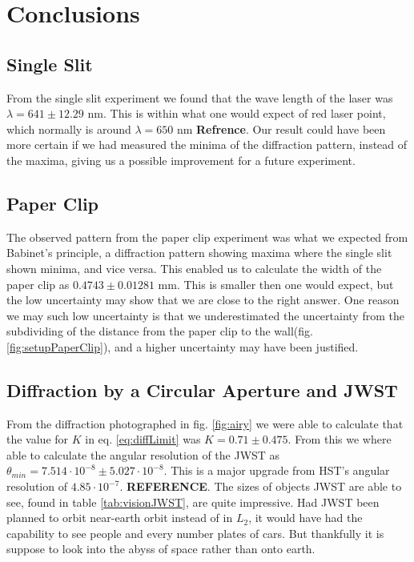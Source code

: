 \documentclass{emulateapj}
\begin{document}
\section{Conclusions}
\label{sec:conclusions}

\subsection{Single Slit}
From the single slit experiment we found that the wave length of the laser was $\lambda = 641 \pm 12.29 \text{ nm}$. This is within what one would expect of red laser point, which normally is around $\lambda = 650$ nm \textbf{Refrence}. Our result could have been more certain if we had measured the minima of the diffraction pattern, instead of the maxima, giving us a possible improvement for a future experiment.

\subsection{Paper Clip}
The observed pattern from the paper clip experiment was what we expected from Babinet's principle, a diffraction pattern showing maxima where the single slit shown minima, and vice versa. This enabled us to calculate the width of the paper clip as $0.4743 \pm 0.01281 \text{ mm}$. This is smaller then one would expect, but the low uncertainty may show that we are close to the right answer. One reason we may such low uncertainty is that we underestimated the uncertainty from the subdividing of the distance from the paper clip to the wall(fig. \ref{fig:setupPaperClip}), and a higher uncertainty may have been justified.

\subsection{Diffraction by a Circular Aperture and JWST}
From the diffraction photographed in fig. \ref{fig:airy} we were able to calculate that the value for $K$ in eq. \ref{eq:diffLimit} was $K = 0.71 \pm 0.475$. From this we where able to calculate the angular resolution of the JWST as  $\theta_{min} = 7.514\cdot 10^{-8} \pm 5.027\cdot 10^{-8}$. This is a major upgrade from HST's angular resolution of $4.85\cdot10^{-7}$. \textbf{REFERENCE}. The sizes of objects JWST are able to see, found in table \ref{tab:visionJWST}, are quite impressive. Had JWST been planned to orbit near-earth orbit instead of in $L_2$, it would have had the capability to see people and every number plates of cars. But thankfully it is suppose to look into the abyss of space rather than onto earth.
\end{document}

